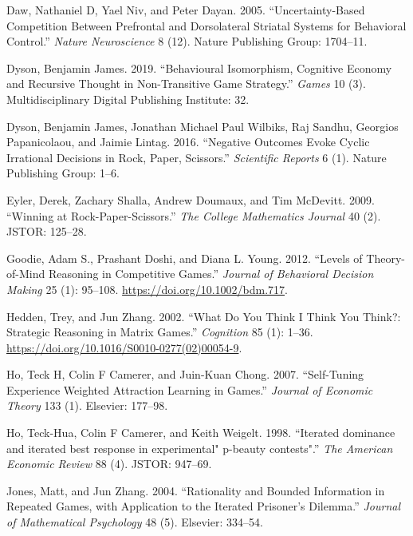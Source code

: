 \documentclass[smallextended]{svjour3}       %
\begin{document}
\leavevmode\hypertarget{ref-daw2005uncertainty}{}%
Daw, Nathaniel D, Yael Niv, and Peter Dayan. 2005. ``Uncertainty-Based
Competition Between Prefrontal and Dorsolateral Striatal Systems for
Behavioral Control.'' \emph{Nature Neuroscience} 8 (12). Nature
Publishing Group: 1704--11.

\leavevmode\hypertarget{ref-dyson2019behavioural}{}%
Dyson, Benjamin James. 2019. ``Behavioural Isomorphism, Cognitive
Economy and Recursive Thought in Non-Transitive Game Strategy.''
\emph{Games} 10 (3). Multidisciplinary Digital Publishing Institute: 32.

\leavevmode\hypertarget{ref-dyson2016negative}{}%
Dyson, Benjamin James, Jonathan Michael Paul Wilbiks, Raj Sandhu,
Georgios Papanicolaou, and Jaimie Lintag. 2016. ``Negative Outcomes
Evoke Cyclic Irrational Decisions in Rock, Paper, Scissors.''
\emph{Scientific Reports} 6 (1). Nature Publishing Group: 1--6.

\leavevmode\hypertarget{ref-eyler2009winning}{}%
Eyler, Derek, Zachary Shalla, Andrew Doumaux, and Tim McDevitt. 2009.
``Winning at Rock-Paper-Scissors.'' \emph{The College Mathematics
Journal} 40 (2). JSTOR: 125--28.

\leavevmode\hypertarget{ref-goodie_levels_2012}{}%
Goodie, Adam S., Prashant Doshi, and Diana L. Young. 2012. ``Levels of
Theory-of-Mind Reasoning in Competitive Games.'' \emph{Journal of
Behavioral Decision Making} 25 (1): 95--108.
\url{https://doi.org/10.1002/bdm.717}.

\leavevmode\hypertarget{ref-hedden_what_2002}{}%
Hedden, Trey, and Jun Zhang. 2002. ``What Do You Think I Think You
Think?: Strategic Reasoning in Matrix Games.'' \emph{Cognition} 85 (1):
1--36. \url{https://doi.org/10.1016/S0010-0277(02)00054-9}.

\leavevmode\hypertarget{ref-ho2007self}{}%
Ho, Teck H, Colin F Camerer, and Juin-Kuan Chong. 2007. ``Self-Tuning
Experience Weighted Attraction Learning in Games.'' \emph{Journal of
Economic Theory} 133 (1). Elsevier: 177--98.

\leavevmode\hypertarget{ref-ho1998iterated}{}%
Ho, Teck-Hua, Colin F Camerer, and Keith Weigelt. 1998. ``Iterated
dominance and iterated best response in experimental" p-beauty
contests".'' \emph{The American Economic Review} 88 (4). JSTOR: 947--69.

\leavevmode\hypertarget{ref-jones2004rationality}{}%
Jones, Matt, and Jun Zhang. 2004. ``Rationality and Bounded Information
in Repeated Games, with Application to the Iterated Prisoner's
Dilemma.'' \emph{Journal of Mathematical Psychology} 48 (5). Elsevier:
334--54.
\end{document}
